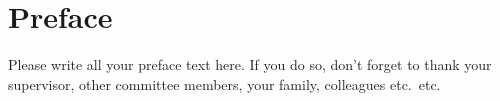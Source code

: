 \chapter*{Preface}\label{chapter:preface}

Please write all your preface text here. If you do so, don't forget to thank your supervisor, other committee members, your family, colleagues etc.\ etc. 